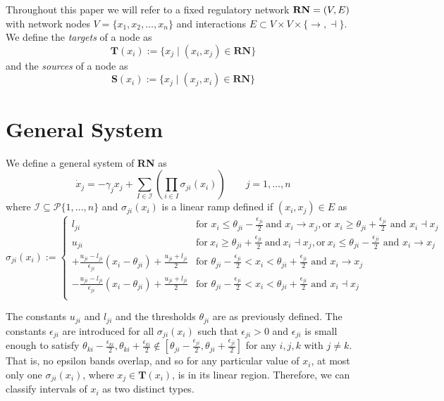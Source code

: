 \documentclass[12pt]{article}
\theoremstyle{definition}
\theoremstyle{remark}
\begin{document}
Throughout this paper we will refer to a fixed regulatory network $\textnormal{\textbf{RN}} = (V,E)$ with network nodes $V = \{x_1,x_2,\dots,x_n\}$ and interactions $E \subset V \times V \times \{\rightarrow,\dashv\}$. We define the \textit{targets} of a node as
\begin{equation*}
\mathbf{T}(x_i):=\{x_j \mid (x_i,x_j) \in \mathbf{RN} \}
\end{equation*}
and the \textit{sources} of a node as 
\begin{equation*}
\mathbf{S}(x_i):=\{x_j \mid (x_j,x_i) \in \mathbf{RN} \}
\end{equation*}

\section{General System}
We define a general system of \textbf{RN} as 
\begin{equation}	\label{generalsystem}
\dot{x}_j=-\gamma_j x_j + \sum_{I\in \mathcal{I}}\left(\prod_{i\in I}\sigma_{ji}(x_i)\right)	\qquad	j=1,\dots,n
\end{equation}
where $\mathcal{I}\subseteq \mathscr{P} \{1,\dots,n\}$ and $\sigma_{ji}(x_i)$  is a linear ramp defined if $(x_i,x_j) \in E$ as
\begin{equation}	\label{sigma}
\sigma_{ji}(x_i):=
\begin{cases}
l_{ji}	&	\text{for } x_i \le \theta_{ji}-\frac{\epsilon_{ji}}{2}\ \text{and } x_i\to x_j, \text{or } x_i\geq\theta_{ji}+\frac{\epsilon_{ji}}{2} \text{ and } x_i\dashv x_j\\
u_{ji}	&	\text{for}\ x_i \geq\theta_{ji}+\frac{\epsilon_{ji}}{2}\ \text{and}\ x_i\dashv x_j, \text{or}\ x_i\le\theta_{ji}-\frac{\epsilon_{ji}}{2} \text{ and } x_i\to x_j\\
+\frac{u_{ji}-l_{ji}}{\epsilon_{ji}}(x_i-\theta_{ji}) + \frac{u_{ji}+l_{ji}}{2} &  \text{for } \theta_{ji}-\frac{\epsilon_{ji}}{2}<x_i<\theta_{ji}+\frac{\epsilon_{ji}}{2} \text{ and } x_i\to x_j\\
-\frac{u_{ji}-l_{ji}}{\epsilon_{ji}}(x_i-\theta_{ji}) + \frac{u_{ji}+l_{ji}}{2} & \text{for } \theta_{ji}-\frac{\epsilon_{ji}}{2}<x_i<\theta_{ji}+\frac{\epsilon_{ji}}{2} \text{ and } x_i\dashv x_j\\
\end{cases}
\end{equation}	

The constants $u_{ji}$ and $l_{ji}$  and the thresholds $\theta_{ji}$ are as previously defined. The constants $\epsilon_{ji}$ are introduced for all $\sigma_{ji}(x_i)$ such that $\epsilon_{ji}>0$ and $\epsilon_{ji}$ is small enough to satisfy $\theta_{ki}-\frac{\epsilon_{ki}}{2},\theta_{ki}+\frac{\epsilon_{ki}}{2}\notin [\theta_{ji}-\frac{\epsilon_{ji}}{2},\theta_{ji}+\frac{\epsilon_{ji}}{2}]$ for any $i,j,k$ with $j \neq k$. That is, no epsilon bands overlap, and so for any particular value of $x_i$, at most only one $\sigma_{ji}(x_i)$, where $x_j\in\mathbf{T}(x_i)$, is in its linear region. Therefore, we can classify intervals of $x_i$ as two distinct types.
\end{document}
